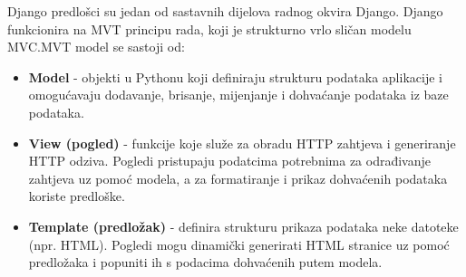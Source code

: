 		Django predlošci su jedan od sastavnih dijelova radnog okvira Django. Django funkcionira na MVT principu rada, koji je strukturno vrlo sličan modelu MVC.\newline MVT model se sastoji od:
\begin{itemize}
		\item 	\textbf{Model} - objekti u Pythonu koji definiraju strukturu podataka aplikacije i omogućavaju dodavanje, brisanje, mijenjanje i dohvaćanje podataka iz baze podataka.
		\item 	\textbf{View (pogled)} - funkcije koje služe za obradu HTTP zahtjeva i generiranje HTTP odziva. Pogledi pristupaju podatcima potrebnima za odrađivanje zahtjeva uz pomoć modela, a za formatiranje i prikaz  dohvaćenih podataka koriste predloške.
		\item 	\textbf{Template (predložak)} - definira strukturu prikaza podataka neke datoteke (npr. HTML). Pogledi mogu dinamički generirati HTML stranice uz pomoć predložaka i popuniti ih s podacima dohvaćenih putem modela. 
				
	\end{itemize}


